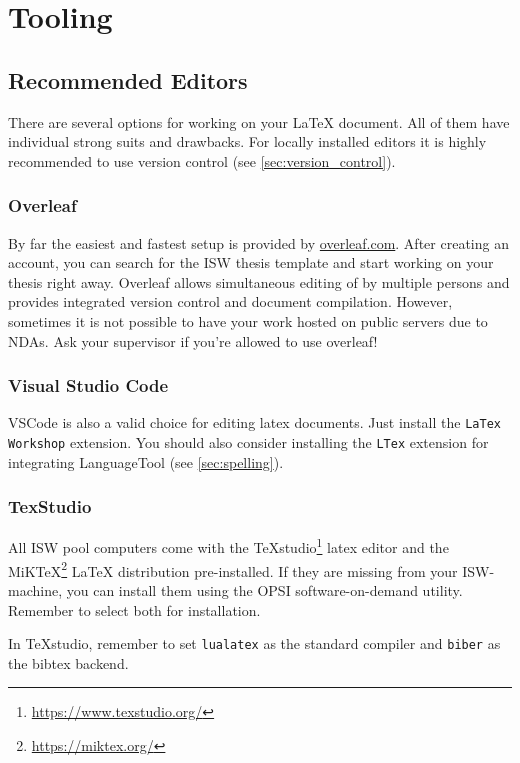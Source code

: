 \chapter{Tooling}

\section{Recommended Editors}
There are several options for working on your LaTeX document. All of them have individual strong suits and drawbacks. For locally installed editors it is highly recommended to use version control (see \autoref{sec:version_control}).

\subsection{Overleaf}
By far the easiest and fastest setup is provided by \url{overleaf.com}. After creating an account, you can search for the \ac{ISW} thesis template and start working on your thesis right away. Overleaf allows simultaneous editing of by multiple persons and provides integrated version control and document compilation.
However, sometimes it is not possible to have your work hosted on public servers due to \acp{NDA}. Ask your supervisor if you're allowed to use overleaf!

\subsection{Visual Studio Code}
VSCode is also a valid choice for editing latex documents. Just install the \texttt{LaTex Workshop} extension. You should also consider installing the \texttt{LTex} extension for integrating LanguageTool (see \autoref{sec:spelling}).

\subsection{TexStudio}
All \ac{ISW} pool computers come with the TeXstudio\footnote{\url{https://www.texstudio.org/}} latex editor and the MiKTeX\footnote{\url{https://miktex.org/}} LaTeX distribution pre-installed. If they are missing from your \ac{ISW}-machine, you can install them using the OPSI software-on-demand utility. Remember to select both for installation.

In TeXstudio, remember to set \texttt{lualatex} as the standard compiler and \texttt{biber} as the bibtex backend.

